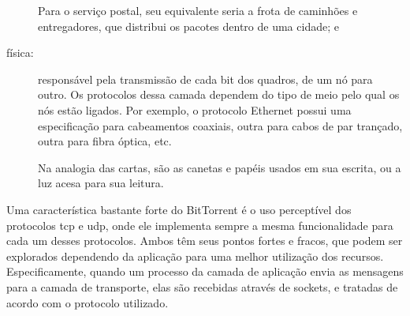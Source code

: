 \begin{description}
        Para o serviço postal, seu equivalente seria a frota de caminhões e
        entregadores, que distribui os pacotes dentro de uma cidade; e

    \item[física:] responsável pela transmissão de cada bit dos quadros, de um nó para
        outro. Os protocolos dessa camada dependem do tipo de meio pelo qual os nós
        estão ligados. Por exemplo, o protocolo Ethernet possui uma especificação para
        cabeamentos coaxiais, outra para cabos de par trançado, outra para fibra óptica,
        etc.

        Na analogia das cartas, são as canetas e papéis usados em sua escrita, ou a luz
        acesa para sua leitura.
\end{description}

Uma característica bastante forte do BitTorrent é o uso perceptível dos protocolos
\gls*{tcp} e \gls*{udp}, onde ele implementa sempre a mesma funcionalidade para cada um
desses protocolos. Ambos têm seus pontos fortes e fracos, que podem ser explorados
dependendo da aplicação para uma melhor utilização dos recursos. Especificamente,
quando um processo da camada de aplicação envia as mensagens para a camada de
transporte, elas são recebidas através de \glspl{socket}, e tratadas de acordo com o
protocolo utilizado.





